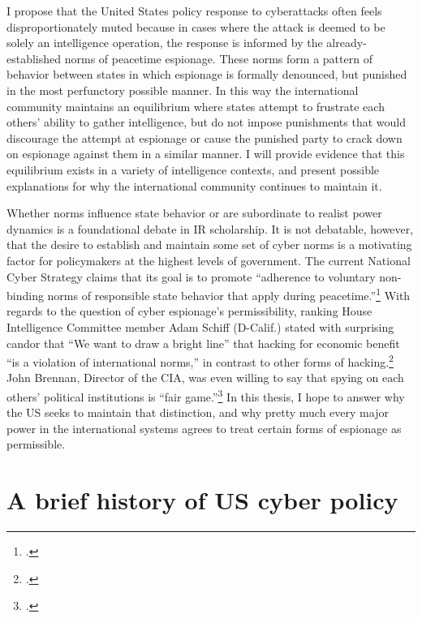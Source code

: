 \documentclass{memoir}
\begin{document}
\begin{refsegment}
I propose that the United States policy response to cyberattacks often feels disproportionately muted because in cases where the attack is deemed to be solely an intelligence operation, the response is informed by the already-established norms of peacetime espionage. These norms form a pattern of behavior between states in which espionage is formally denounced, but punished in the most perfunctory possible manner. In this way the international community maintains an equilibrium where states attempt to frustrate each others' ability to gather intelligence, but do not impose punishments that would discourage the attempt at espionage or cause the punished party to crack down on espionage against them in a similar manner. I will provide evidence that this equilibrium exists in a variety of intelligence contexts, and present possible explanations for why the international community continues to maintain it.

Whether norms influence state behavior or are subordinate to realist power dynamics is a foundational debate in IR scholarship. It is not debatable, however, that the desire to establish and maintain some set of cyber norms is a motivating factor for policymakers at the highest levels of government. The current National Cyber Strategy claims that its goal is to promote ``adherence to voluntary non-binding norms of responsible state behavior that apply during peacetime.''\footcite[p.~20]{trump_national_2018} With regards to the question of cyber espionage's permissibility, ranking House Intelligence Committee member Adam Schiff (D-Calif.) stated with surprising candor that ``We want to draw a bright line” that hacking for economic benefit “is a violation of international norms,'' in contrast to other forms of hacking.\footcite{nakashima_hacks_2015} John Brennan, Director of the CIA, was even willing to say that spying on each others' political institutions is ``fair game.''\footcite{sanger_u.s._2016} In this thesis, I hope to answer why the US seeks to maintain that distinction, and why pretty much every major power in the international systems agrees to treat certain forms of espionage as permissible.

\section{A brief history of US cyber policy}

\end{refsegment}
\end{document}
